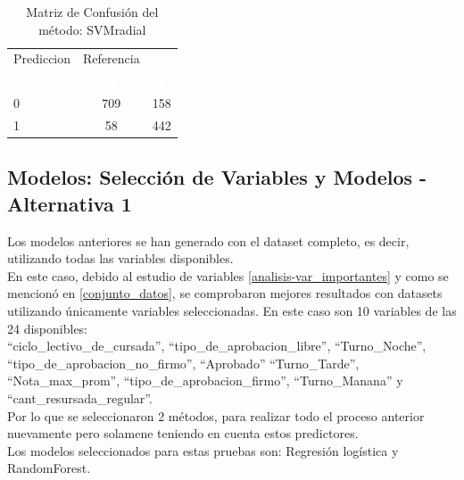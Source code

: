 \begin{table}[!h]
	
	\caption{\label{tab:MatrizConf_SVMradial}Matriz de Confusión del método: SVMradial }
	\centering
	\begin{tabular}[t]{lcc}
		\toprule
		\multicolumn{1}{c}{Prediccion} & \multicolumn{1}{c}{Referencia} & \multicolumn{1}{c}{ } \\
		\cmidrule(l{3pt}r{3pt}){1-1} \cmidrule(l{3pt}r{3pt}){2-2}
		\rowcolor{black}  \multicolumn{1}{c}{\textcolor{white}{\textbf{ }}} & \multicolumn{1}{c}{\textcolor{white}{\textbf{0}}} & \multicolumn{1}{c}{\textcolor{white}{\textbf{1}}}\\
		\midrule
		\rowcolor{gray!6}  0 & 709 & 158\\
		1 & 58 & 442\\
		\bottomrule
	\end{tabular}
\end{table}



\clearpage

\subsection{Modelos: Selección de Variables y Modelos - Alternativa 1}

Los modelos anteriores se han generado con el dataset completo, es decir, utilizando todas las variables disponibles.\\

En este caso, debido al estudio de variables \ref{analisis-var_importantes} y como se mencionó en \ref{conjunto_datos}, se comprobaron mejores resultados
con datasets utilizando únicamente variables seleccionadas. En este caso son 10 variables de las 24 disponibles:\\

``ciclo\_lectivo\_de\_cursada'', ``tipo\_de\_aprobacion\_libre'',
``Turno\_Noche'', ``tipo\_de\_aprobacion\_no\_firmo'', ``Aprobado''
``Turno\_Tarde'', ``Nota\_max\_prom'', ``tipo\_de\_aprobacion\_firmo'',
``Turno\_Manana'' y ``cant\_resursada\_regular''.\\


Por lo que se seleccionaron 2 métodos, para realizar todo el proceso
anterior nuevamente pero solamene teniendo en cuenta estos predictores.\\


Los modelos seleccionados para estas pruebas son: Regresión logística y
RandomForest.


